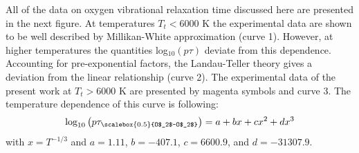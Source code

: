 \documentclass[10pt]{beamer}
\begin{document}

\begin{frame}
All of the data on oxygen vibrational relaxation time discussed here are
presented in the next figure. At temperatures $T_t<6000$ K the experimental data
are shown to be well described by Millikan-White approximation (curve 1).
However, at higher temperatures the quantities log$_{10}(p\tau)$ deviate from
this dependence. Accounting for pre-exponential factors, the Landau-Teller theory
gives a deviation from the linear relationship (curve 2). The experimental data
of the present work at $T_t>6000$ K are presented by magenta symbols and curve
3. The temperature dependence of this curve is following:
\begin{equation*}
\text{log}_{10}\left(p\tau_{\scalebox{0.5}{O$_2$-O$_2$}}\right)=a+bx+cx^2+dx^3
\end{equation*}
with $x=T^{-1/3}$ and $a=1.11$, $b=-407.1$, $c=6600.9$, and $d=-31307.9$.
\end{frame}
\end{document}
